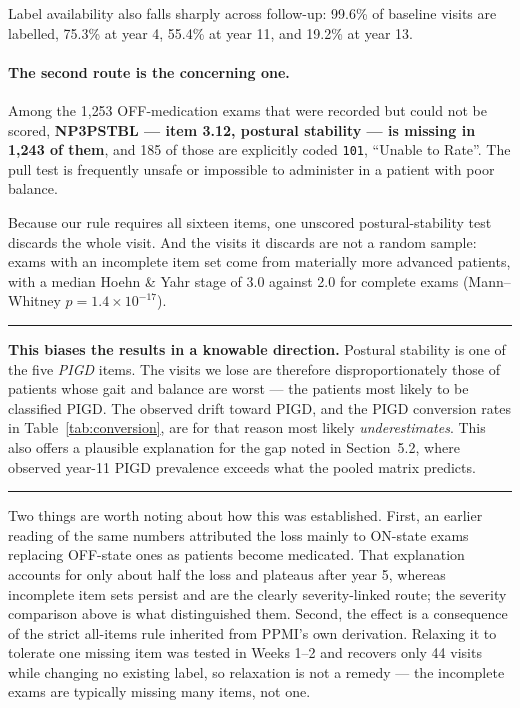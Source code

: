 \documentclass[11pt,a4paper]{article}
\newcommand{\code}[1]{\texttt{\small #1}}
\newenvironment{keypoint}
  {\begin{center}\begin{minipage}{0.94\textwidth}%
   \vspace{4pt}\hrule\vspace{7pt}\small}
  {\vspace{7pt}\hrule\vspace{4pt}\end{minipage}\end{center}}
\begin{document}
\noindent
Label availability also falls sharply across follow-up: 99.6\% of baseline
visits are labelled, 75.3\% at year 4, 55.4\% at year 11, and 19.2\% at
year 13.

\paragraph{The second route is the concerning one.} Among the 1{,}253
OFF-medication exams that were recorded but could not be scored,
\textbf{NP3PSTBL --- item 3.12, postural stability --- is missing in 1{,}243 of
them}, and 185 of those are explicitly coded \code{101}, ``Unable to Rate''. The
pull test is frequently unsafe or impossible to administer in a patient with
poor balance.

Because our rule requires all sixteen items, one unscored postural-stability
test discards the whole visit. And the visits it discards are not a random
sample: exams with an incomplete item set come from materially more advanced
patients, with a median Hoehn \& Yahr stage of 3.0 against 2.0 for complete
exams (Mann--Whitney $p = 1.4 \times 10^{-17}$).

\begin{keypoint}
\textbf{This biases the results in a knowable direction.} Postural stability is
one of the five \emph{PIGD} items. The visits we lose are therefore
disproportionately those of patients whose gait and balance are worst --- the
patients most likely to be classified PIGD. The observed drift toward PIGD, and
the PIGD conversion rates in Table~\ref{tab:conversion}, are for that reason
most likely \emph{underestimates}. This also offers a plausible explanation for
the gap noted in Section~5.2, where observed year-11 PIGD prevalence exceeds
what the pooled matrix predicts.
\end{keypoint}

\noindent
Two things are worth noting about how this was established. First, an earlier
reading of the same numbers attributed the loss mainly to ON-state exams
replacing OFF-state ones as patients become medicated. That explanation
accounts for only about half the loss and plateaus after year 5, whereas
incomplete item sets persist and are the clearly severity-linked route; the
severity comparison above is what distinguished them. Second, the effect is a
consequence of the strict all-items rule inherited from PPMI's own derivation.
Relaxing it to tolerate one missing item was tested in Weeks 1--2 and recovers
only 44 visits while changing no existing label, so relaxation is not a
remedy --- the incomplete exams are typically missing many items, not one.
\end{document}
